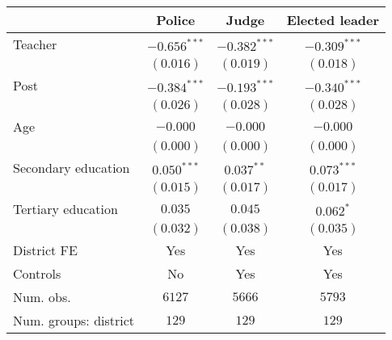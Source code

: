 
\begin{tabular}{l c c c}
\toprule
 & Police & Judge & Elected leader \\
\midrule
Teacher               & $-0.656^{***}$ & $-0.382^{***}$ & $-0.309^{***}$ \\
                      & $(0.016)$      & $(0.019)$      & $(0.018)$      \\
Post                  & $-0.384^{***}$ & $-0.193^{***}$ & $-0.340^{***}$ \\
                      & $(0.026)$      & $(0.028)$      & $(0.028)$      \\
Age                   & $-0.000$       & $-0.000$       & $-0.000$       \\
                      & $(0.000)$      & $(0.000)$      & $(0.000)$      \\
Secondary education   & $0.050^{***}$  & $0.037^{**}$   & $0.073^{***}$  \\
                      & $(0.015)$      & $(0.017)$      & $(0.017)$      \\
Tertiary education    & $0.035$        & $0.045$        & $0.062^{*}$    \\
                      & $(0.032)$      & $(0.038)$      & $(0.035)$      \\
\midrule
District FE           & Yes            & Yes            & Yes            \\
Controls              & No             & Yes            & Yes            \\
Num. obs.             & $6127$         & $5666$         & $5793$         \\
Num. groups: district & $129$          & $129$          & $129$          \\
\bottomrule
\end{tabular}
